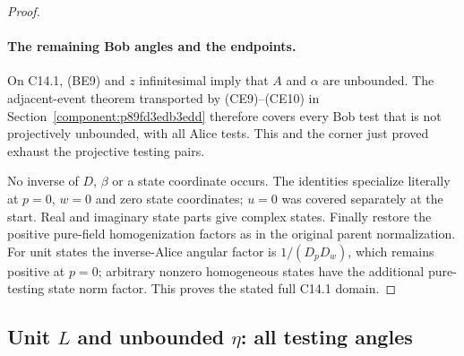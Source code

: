 \begin{proof}
\paragraph{The remaining Bob angles and the endpoints.}
On C14.1, (BE9) and $z$ infinitesimal imply that $A$ and $\alpha$
are unbounded. The adjacent-event theorem transported by
(CE9)--(CE10) in Section~\ref{component:p89fd3edb3edd} therefore
covers every Bob test that is not projectively unbounded, with all
Alice tests. This and the corner just proved exhaust the projective
testing pairs.

No inverse of $D$, $\beta$ or a state coordinate occurs. The
identities specialize literally at $p=0$, $w=0$ and zero state
coordinates; $u=0$ was covered separately at the start. Real and
imaginary state parts give complex states. Finally restore the
positive pure-field homogenization factors as in the original
parent normalization. For unit states the inverse-Alice angular
factor is $1/(D_pD_w)$, which remains positive at $p=0$; arbitrary
nonzero homogeneous states have the additional pure-testing state
norm factor. This proves the stated full C14.1 domain.
\end{proof}

\subsection{Unit \texorpdfstring{$L$}{L} and unbounded \texorpdfstring{$\eta$}{eta}: all testing angles}
\label{component:pb0d9d28d0849}
\label{component:pda4a21937f64}

